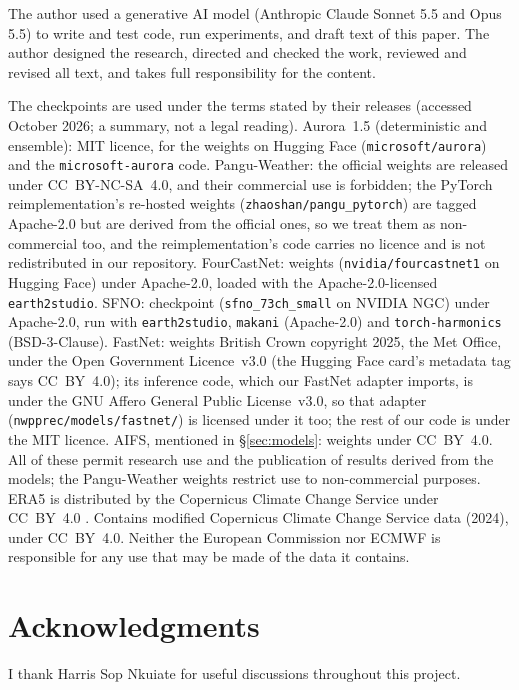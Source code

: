 \documentclass[11pt]{article}
\begin{document}
The author used a generative AI model (Anthropic Claude Sonnet 5.5 and Opus 5.5) to write and test
code, run experiments, and draft text of this paper. The author designed the research, directed and
checked the work, reviewed and revised all text, and takes full responsibility for the content.

The checkpoints are used under the terms stated by their
releases (accessed October 2026; a summary, not a legal reading).
Aurora~1.5 (deterministic and ensemble): MIT licence, for the weights on
Hugging Face (\texttt{microsoft/aurora}) and the \texttt{microsoft-aurora}
code. Pangu-Weather: the official weights are released under CC~BY-NC-SA~4.0,
and their commercial use is forbidden; the PyTorch reimplementation's
re-hosted weights (\texttt{zhaoshan/pangu\_pytorch}) are tagged
Apache-2.0 but are derived from the official ones, so we treat them as
non-commercial too, and the reimplementation's code carries no licence and
is not redistributed in our repository. FourCastNet: weights
(\texttt{nvidia/fourcastnet1} on Hugging Face) under Apache-2.0, loaded
with the Apache-2.0-licensed \texttt{earth2studio}. SFNO: checkpoint
(\texttt{sfno\_73ch\_small} on NVIDIA NGC) under Apache-2.0, run with
\texttt{earth2studio}, \texttt{makani} (Apache-2.0) and
\texttt{torch-harmonics} (BSD-3-Clause). FastNet: weights British Crown
copyright 2025, the Met Office, under the Open Government Licence~v3.0
(the Hugging Face card's metadata tag says CC~BY~4.0); its inference code,
which our FastNet adapter imports, is under the GNU Affero General Public
License~v3.0, so that adapter (\texttt{nwpprec/models/fastnet/}) is
licensed under it too; the rest of our code is under the MIT licence. AIFS, mentioned in \S\ref{sec:models}: weights
under CC~BY~4.0. All of these permit research use and the publication of
results derived from the models; the Pangu-Weather weights restrict use to
non-commercial purposes. ERA5 is distributed by the Copernicus Climate
Change Service under CC~BY~4.0 \citep{hersbach2020era5}. Contains modified Copernicus Climate
Change Service data (2024), under CC~BY~4.0. Neither the European Commission
nor ECMWF is responsible for any use that may be made of the data it contains.

\section*{Acknowledgments}
I thank Harris Sop Nkuiate for useful discussions throughout this project.




\appendix

\end{document}
